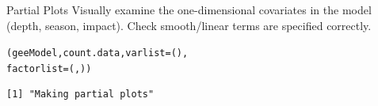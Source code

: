 \begin{frame}[fragile]
\frametitle{}
\begin{block}{Partial Plots}
Visually examine the one-dimensional covariates in the model (depth, season, impact).
Check smooth/linear terms are specified correctly.
\end{block}

\begin{knitrout}\footnotesize
{}\color{fgcolor}\begin{kframe}
\begin{alltt}
(geeModel, count.data, varlist = (), 
     factorlist =(, ))
\end{alltt}
\begin{verbatim}
[1] "Making partial plots"
\end{verbatim}
\end{kframe}
\end{knitrout}

\end{frame}

